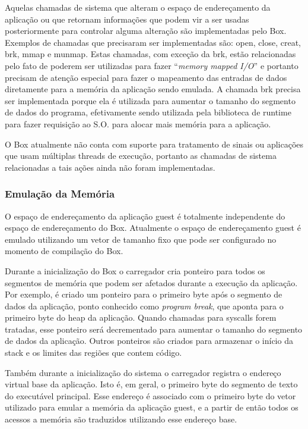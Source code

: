 \documentclass[11pt,twoside]{article}
\begin{document}
Aquelas chamadas de sistema que alteram o espaço de endereçamento da aplicação
ou que retornam informações que podem vir a ser usadas posteriormente para
controlar alguma alteração são implementadas pelo Box.  Exemplos de chamadas que
precisaram ser implementadas são: open, close, creat, brk, mmap e munmap. Estas
chamadas, com exceção da brk, estão relacionadas pelo fato de poderem ser
utilizadas para fazer ``\emph{memory mapped I/O}'' e portanto precisam de atenção
especial para fazer o mapeamento das entradas de dados diretamente para a
memória da aplicação sendo emulada. A chamada brk precisa ser implementada
porque ela é utilizada para aumentar o tamanho do segmento de dados do programa,
efetivamente sendo utilizada pela biblioteca de runtime para fazer requisição ao
S.O. para alocar mais memória para a aplicação.

O Box atualmente não conta com suporte para tratamento de sinais ou aplicações
que usam múltiplas threads de execução, portanto as chamadas de sistema
relacionadas a tais ações ainda não foram implementadas.

\subsubsection{Emulação da Memória}

O espaço de endereçamento da aplicação guest é totalmente independente do espaço
de endereçamento do Box. Atualmente o espaço de endereçamento guest é emulado
utilizando um vetor de tamanho fixo que pode ser configurado no momento de
compilação do Box.

Durante a inicialização do Box o carregador cria ponteiro para todos os
segmentos de memória que podem ser afetados durante a execução da aplicação.
Por exemplo, é criado um ponteiro para o primeiro byte após o segmento de dados
da aplicação, ponto conhecido como \emph{program break}, que aponta
para o primeiro byte do heap da aplicação. Quando chamadas para syscalls forem
tratadas, esse ponteiro será decrementado para aumentar o tamanho do segmento de
dados da aplicação. Outros ponteiros são criados para armazenar o início da
stack e os limites das regiões que contem código.

Também durante a inicialização do sistema o carregador registra o endereço
virtual base da aplicação. Isto é, em geral, o primeiro byte do segmento de
texto do executável principal. Esse endereço é associado com o primeiro byte do
vetor utilizado para emular a memória da aplicação guest, e a partir de então
todos os acessos a memória são traduzidos utilizando esse endereço base.
\end{document}
